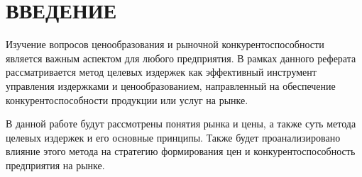 \chapter*{ВВЕДЕНИЕ}

Изучение вопросов ценообразования и рыночной конкурентоспособности является важным аспектом для любого предприятия. 
В рамках данного реферата рассматривается метод целевых издержек как эффективный инструмент управления издержками и ценообразованием, направленный на обеспечение конкурентоспособности продукции или услуг на рынке. 

В данной работе будут рассмотрены понятия рынка и цены, а также суть метода целевых издержек и его основные принципы.
Также будет проанализировано влияние этого метода на стратегию формирования цен и конкурентоспособность предприятия на рынке.
